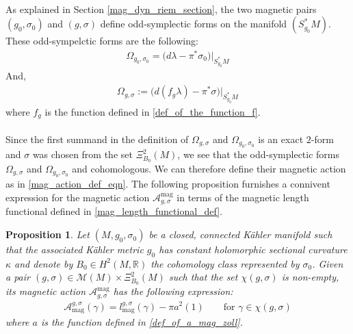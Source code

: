 \documentclass[11pt]{amsart}
\theoremstyle{plain}
\newtheorem{proposition}[theorem]{Proposition}
\theoremstyle{definition}
\theoremstyle{remark}
\begin{document}
\\
As explained in Section \ref{mag_dyn_riem_section}, the two magnetic pairs $(g_0,\sigma_0)$ and $(g,\sigma)$ define odd-symplectic forms on the manifold $(S^*_{g_0}M)$. These odd-sympelctic forms are the following:
\begin{align}
  \Omega_{g_0,\sigma_0}= \big(d\lambda-\pi^*\sigma_0\big)\vert_{S^*_{g_0}M} 
\end{align}
And,
\begin{align}
    \Omega_{g,\sigma}:= \big(d(f_g\lambda)-\pi^*\sigma\big)\vert_{S^*_{g_0}M} 
\end{align}
where $f_g$ is the function defined in \eqref{def_of_the_function_f}.\\
\\
Since the first summand in the definition of $\Omega_{g,\sigma}$ and $\Omega_{g_0,\sigma_0}$ is an exact $2$-form and $\sigma$ was chosen from the set $\Xi^2_{B_0}(M)$, we see that the odd-symplectic forms $\Omega_{g,\sigma}$ and $\Omega_{g_0,\sigma_0}$ and cohomologous. We can therefore define their magnetic action as in \eqref{mag_action_def_eqn}. The following proposition furnishes a connivent expression for the magnetic action $\mathcal{A}^{\text{mag}}_{{g,\sigma}}$ in terms of the magnetic length functional defined in \eqref{mag_length_functional_def}.
\begin{proposition}\label{cpn_action_paradigm_2}
Let $(M,g_0,\sigma_0)$ be a closed, connected K\"ahler manifold such that the associated K\"ahler metric $g_0$ has constant holomorphic sectional curvature $\kappa$ and denote by $B_0 \in H^2(M,\mathbb{R})$ the cohomology class represented by $\sigma_0$. Given a pair $(g,\sigma) \in \mathcal{M}(M) \times \Xi^2_{B_0}(M)$ such that the set $\chi(g,\sigma)$ is non-empty, its magnetic action $\mathcal{A}^{\text{mag}}_{{g,\sigma}}$ has the following expression:
\begin{align}
\mathcal{A}_{\text{mag}}^{{g,\sigma}}(\gamma) = l^{g, \sigma}_{\text{mag}}(\gamma) - \pi a^2(1) \qquad \text{for $\gamma \in \chi(g,\sigma)$}
\end{align}
where $a$ is the function defined in \eqref{def_of_a_mag_zoll}.
 \end{proposition}
\end{document}
